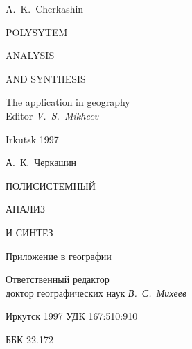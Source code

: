 \documentclass[12pt,draft,openany]{extbook}
\begin{document}
\begingroup
\thispagestyle{empty}
\mbox{}

\ptsans
\vspace{13ex}
\centering\large
\noindent{}A.~K.~Cherkashin

\vspace{6ex}

{\Huge\bfseries

POLYSYTEM

ANALYSIS

AND SYNTHESIS

}
\vspace{1em}

The application in geography
\\[0.7em]
{\normalsize{} Editor {\itshape{} V.~S.~Mikheev}}
\vfill{}

Irkutsk 1997
\mbox{}
\endgroup
\newpage
\begingroup
\mbox{}
\thispagestyle{empty}

\ptsans
\vspace{13ex}
\centering\large
\noindent{}А.~К.~Черкашин

\vspace{6ex}

{\Huge\bfseries

ПОЛИСИСТЕМНЫЙ

АНАЛИЗ

И СИНТЕЗ

}
\vspace{1em}

Приложение в географии
\vspace{1em}

{\normalsize\parskip0pt
Ответственный редактор\\[-0.5em] доктор географических наук {\itshape В.~С.~Михеев}}
\vfill{}

Иркутск 1997
\mbox{}
\endgroup
\newpage{}
\begingroup
\newcommand\sucopyright{{\ptserif\copyright}}
\newcommand\ISBN{ISBN 5--02--030607--X}
\thispagestyle{empty}
\noindent{}УДК 167:510:910

\noindent{}ББК 22.172

\vspace{2em}
\end{document}
